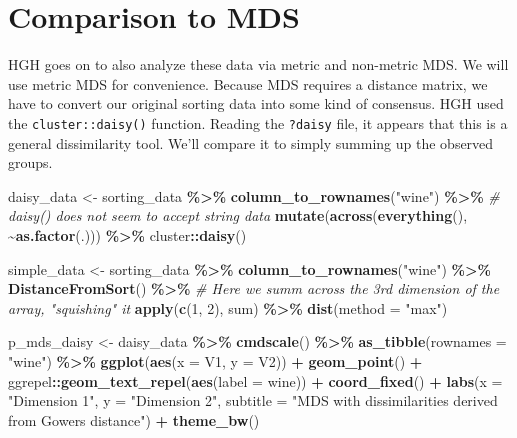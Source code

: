 \documentclass[
]{book}
\newenvironment{Shaded}{\begin{snugshade}}{\end{snugshade}}
\newcommand{\AttributeTok}[1]{\textcolor[rgb]{0.13,0.29,0.53}{#1}}
\newcommand{\CommentTok}[1]{\textcolor[rgb]{0.56,0.35,0.01}{\textit{#1}}}
\newcommand{\DecValTok}[1]{\textcolor[rgb]{0.00,0.00,0.81}{#1}}
\newcommand{\FunctionTok}[1]{\textcolor[rgb]{0.13,0.29,0.53}{\textbf{#1}}}
\newcommand{\NormalTok}[1]{#1}
\newcommand{\OtherTok}[1]{\textcolor[rgb]{0.56,0.35,0.01}{#1}}
\newcommand{\SpecialCharTok}[1]{\textcolor[rgb]{0.81,0.36,0.00}{\textbf{#1}}}
\newcommand{\StringTok}[1]{\textcolor[rgb]{0.31,0.60,0.02}{#1}}
\begin{document}
\section{Comparison to MDS}\label{comparison-to-mds}

HGH goes on to also analyze these data via metric and non-metric MDS. We will use metric MDS for convenience. Because MDS requires a distance matrix, we have to convert our original sorting data into some kind of consensus. HGH used the \texttt{cluster::daisy()} function. Reading the \texttt{?daisy} file, it appears that this is a general dissimilarity tool. We'll compare it to simply summing up the observed groups.

\begin{Shaded}
\begin{Highlighting}[]
\NormalTok{daisy\_data }\OtherTok{\textless{}{-}} 
\NormalTok{  sorting\_data }\SpecialCharTok{\%\textgreater{}\%} 
  \FunctionTok{column\_to\_rownames}\NormalTok{(}\StringTok{"wine"}\NormalTok{) }\SpecialCharTok{\%\textgreater{}\%}
  \CommentTok{\# \textasciigrave{}daisy()\textasciigrave{} does not seem to accept string data}
  \FunctionTok{mutate}\NormalTok{(}\FunctionTok{across}\NormalTok{(}\FunctionTok{everything}\NormalTok{(), }\SpecialCharTok{\textasciitilde{}}\FunctionTok{as.factor}\NormalTok{(.))) }\SpecialCharTok{\%\textgreater{}\%}
\NormalTok{  cluster}\SpecialCharTok{::}\FunctionTok{daisy}\NormalTok{()}

\NormalTok{simple\_data }\OtherTok{\textless{}{-}} 
\NormalTok{  sorting\_data }\SpecialCharTok{\%\textgreater{}\%}
  \FunctionTok{column\_to\_rownames}\NormalTok{(}\StringTok{"wine"}\NormalTok{) }\SpecialCharTok{\%\textgreater{}\%}
  \FunctionTok{DistanceFromSort}\NormalTok{() }\SpecialCharTok{\%\textgreater{}\%}
  \CommentTok{\# Here we summ across the 3rd dimension of the array, "squishing" it }
  \FunctionTok{apply}\NormalTok{(}\FunctionTok{c}\NormalTok{(}\DecValTok{1}\NormalTok{, }\DecValTok{2}\NormalTok{), sum) }\SpecialCharTok{\%\textgreater{}\%}
  \FunctionTok{dist}\NormalTok{(}\AttributeTok{method =} \StringTok{"max"}\NormalTok{)}

\NormalTok{p\_mds\_daisy }\OtherTok{\textless{}{-}} 
\NormalTok{  daisy\_data }\SpecialCharTok{\%\textgreater{}\%}
  \FunctionTok{cmdscale}\NormalTok{() }\SpecialCharTok{\%\textgreater{}\%}
  \FunctionTok{as\_tibble}\NormalTok{(}\AttributeTok{rownames =} \StringTok{"wine"}\NormalTok{) }\SpecialCharTok{\%\textgreater{}\%}
  \FunctionTok{ggplot}\NormalTok{(}\FunctionTok{aes}\NormalTok{(}\AttributeTok{x =}\NormalTok{ V1, }\AttributeTok{y =}\NormalTok{ V2)) }\SpecialCharTok{+} 
  \FunctionTok{geom\_point}\NormalTok{() }\SpecialCharTok{+} 
\NormalTok{  ggrepel}\SpecialCharTok{::}\FunctionTok{geom\_text\_repel}\NormalTok{(}\FunctionTok{aes}\NormalTok{(}\AttributeTok{label =}\NormalTok{ wine)) }\SpecialCharTok{+} 
  \FunctionTok{coord\_fixed}\NormalTok{() }\SpecialCharTok{+} 
  \FunctionTok{labs}\NormalTok{(}\AttributeTok{x =} \StringTok{"Dimension 1"}\NormalTok{, }\AttributeTok{y =} \StringTok{"Dimension 2"}\NormalTok{,}
       \AttributeTok{subtitle =} \StringTok{"MDS with dissimilarities derived from Gower\textquotesingle{}s distance"}\NormalTok{) }\SpecialCharTok{+} 
  \FunctionTok{theme\_bw}\NormalTok{()}


\end{Highlighting}
\end{Shaded}
\end{document}
